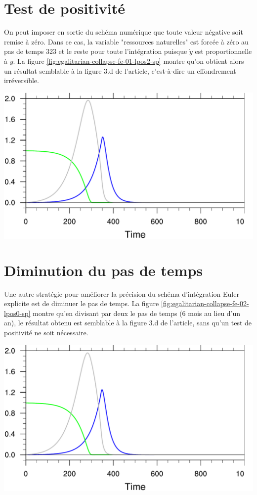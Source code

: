 \documentclass[12pt]{scrartcl}
\begin{document}
\section{Test de positivité}
On peut imposer en sortie du schéma numérique que toute valeur négative soit remise à zéro. Dans ce cas, la variable "ressources naturelles" est forcée à zéro au pas de temps 323 et le reste pour toute l'intégration puisque $\dot{y}$ est proportionnelle à $y$. La figure \ref{fig:egalitarian-collapse-fe-01-lpos2-sp} montre qu'on obtient alors un résultat semblable à la figure 3.d de l'article, c'est-à-dire un effondrement irréversible.

\begin{center}
\includegraphics[width=0.7\linewidth]{../ncl/egalitarian-collapse-fe-01-lpos2-sp.pdf}
\end{center}

\section{Diminution du pas de temps}
Une autre stratégie pour améliorer la précision du schéma d'intégration Euler explicite est de diminuer le pas de temps. La figure \ref{fig:egalitarian-collapse-fe-02-lpos0-sp} montre qu'en divisant par deux le pas de temps (6 mois au lieu d'un an), le résultat obtenu est semblable à la figure 3.d de l'article, sans qu'un test de positivité ne soit nécessaire.

\begin{center}
\includegraphics[width=0.7\linewidth]{../ncl/egalitarian-collapse-fe-02-lpos0-sp.pdf}
\end{center}
\end{document}
